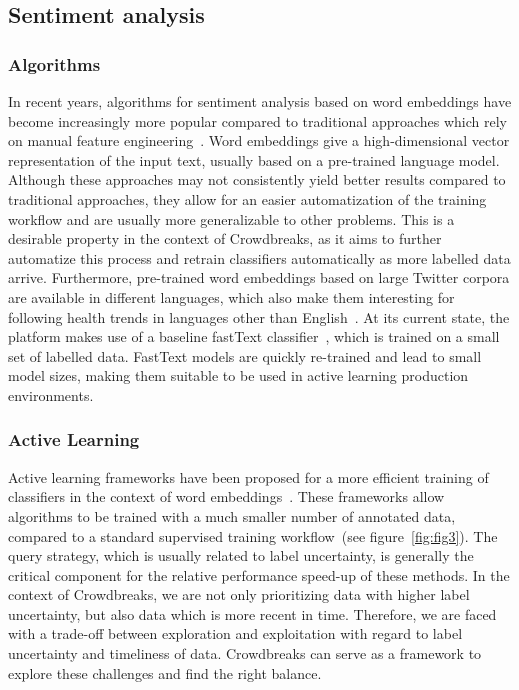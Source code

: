 \documentclass[a4paper, 11pt]{article}
\begin{document}
\subsection{Sentiment analysis}

\subsubsection{Algorithms}
\label{sec:training}
In recent years, algorithms for sentiment analysis based on word embeddings have become increasingly more popular compared to traditional approaches which rely on manual feature engineering~\cite{Bengio2003,mikolov2013efficient,joulin2016bag}.
Word embeddings give a high-dimensional vector representation of the input text, usually based on a pre-trained language model.
Although these approaches may not consistently yield better results compared to traditional approaches, they allow for an easier automatization of the training workflow and are usually more generalizable to other problems.
This is a desirable property in the context of Crowdbreaks, as it aims to further automatize this process and retrain classifiers automatically as more labelled data arrive.
Furthermore, pre-trained word embeddings based on large Twitter corpora are available in different languages, which also make them interesting for following health trends in languages other than English~\cite{deriu2017leveraging}.
At its current state, the platform makes use of a baseline fastText classifier~\cite{joulin2016bag}, which is trained on a small set of labelled data.
FastText models are quickly re-trained and lead to small model sizes, making them suitable to be used in active learning production environments.

\subsubsection{Active Learning}
Active learning frameworks have been proposed for a more efficient training of classifiers in the context of word embeddings~\cite{Kholghi2017,Zhang2016}. 
These frameworks allow algorithms to be trained with a much smaller number of annotated data, compared to a standard supervised training workflow~(see figure~\ref{fig:fig3}).
The query strategy, which is usually related to label uncertainty, is generally the critical component for the relative performance speed-up of these methods. 
In the context of Crowdbreaks, we are not only prioritizing data with higher label uncertainty, but also data which is more recent in time.
Therefore, we are faced with a trade-off between exploration and exploitation with regard to label uncertainty and timeliness of data.
Crowdbreaks can serve as a framework to explore these challenges and find the right balance.
\end{document}
